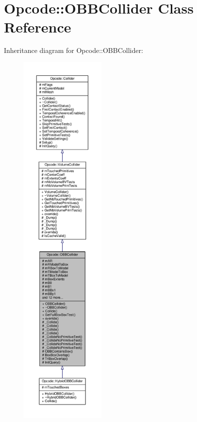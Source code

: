 \hypertarget{classOpcode_1_1OBBCollider}{}\section{Opcode\+:\+:O\+B\+B\+Collider Class Reference}
\label{classOpcode_1_1OBBCollider}


Inheritance diagram for Opcode\+:\+:O\+B\+B\+Collider\+:
\nopagebreak
\begin{figure}[H]
\begin{center}
\leavevmode
\includegraphics[height=550pt]{db/dd0/classOpcode_1_1OBBCollider__inherit__graph}
\end{center}
\end{figure}


